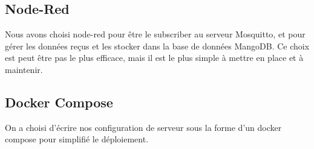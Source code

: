 \subsection{Node-Red}
Nous avons choisi node-red pour être le subscriber au serveur Mosquitto, et pour gérer les données reçus et les stocker dans la base de données MangoDB. Ce choix est peut être pas le plus efficace, mais il est le plus simple à mettre en place et à maintenir.
\subsection{Docker Compose}
On a choisi d'écrire nos configuration de serveur sous la forme d'un docker compose pour simplifié le déploiement.

